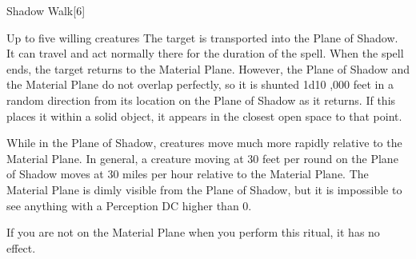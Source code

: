 \begin{spellsection}{Shadow Walk}[6]
    \begin{spellheader}
    \end{spellheader}
    \begin{spellcontent}
        \begin{spelltargetinginfo}
        \end{spelltargetinginfo}
        \begin{spelleffects}

            \begin{spelltargets}{Up to five willing creatures}
                \spelleffect The target is transported into the Plane of Shadow. It can travel and act normally there for the duration of the spell. When the spell ends, the target returns to the Material Plane. However, the Plane of Shadow and the Material Plane do not overlap perfectly, so it is shunted 1d10 ,000 feet in a random direction from its location on the Plane of Shadow as it returns. If this places it within a solid object, it appears in the closest open space to that point.
            \end{spelltargets}
            \spelldur \durext \dismissable
        \end{spelleffects}
    \end{spellcontent}
    \begin{spellfooter}
        \spellnotes While in the Plane of Shadow, creatures move much more rapidly relative to the Material Plane. In general, a creature moving at 30 feet per round on the Plane of Shadow moves at 30 miles per hour relative to the Material Plane. The Material Plane is dimly visible from the Plane of Shadow, but it is impossible to see anything with a Perception DC higher than 0.

        If you are not on the Material Plane when you perform this ritual, it has no effect.
    \end{spellfooter}
\end{spellsection}

